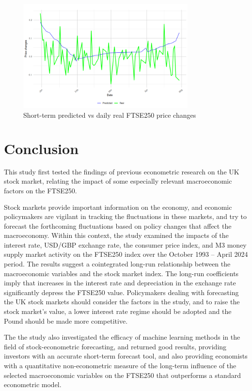 \documentclass[11pt,a4paper]{article}
\begin{document}
\begin{figure}[h]
    \centering
    \includegraphics[width=0.8\textwidth]{short-term-daily.png}
    \caption{Short-term predicted vs daily real FTSE250 price changes}
    \label{fig:sdaily}
\end{figure}

\section{Conclusion}

This study first tested the findings of previous econometric research on the 
UK stock market, relating the impact of some especially
relevant macroeconomic factors on the FTSE250. 

Stock markets provide important information on the economy, 
and economic policymakers are vigilant in tracking the fluctuations 
in these markets, and try to forecast the 
forthcoming fluctuations based on policy changes that affect the macroeconomy.
Within this context, the study examined the 
impacts of the interest rate, USD/GBP
exchange rate, the consumer price index, and 
M3 money supply market activity on
the FTSE250 index over the October 1993 – April 2024 period.
The results suggest a cointegrated long-run
relationship between the macroeconomic variables and the stock market index. 
The long-run coefficients imply that
increases in the interest rate and depreciation in the exchange rate
significantly depress the FTSE250 value. 
Policymakers dealing with forecasting the UK stock markets
should consider the factors in the study, and to raise the stock
market's value, a lower interest rate regime should be adopted and 
the Pound should be made more competitive.

The the study also investigated the efficacy of machine learning methods in 
the field of stock-econometric forecasting, and returned good results, providing investors
with an accurate short-term forecast tool, and also providing economists
with a quantitative non-econometric measure of the 
long-term influence of the selected macroeconomic 
variables on the FTSE250 that outperforms a standard econometric model.
\end{document}
